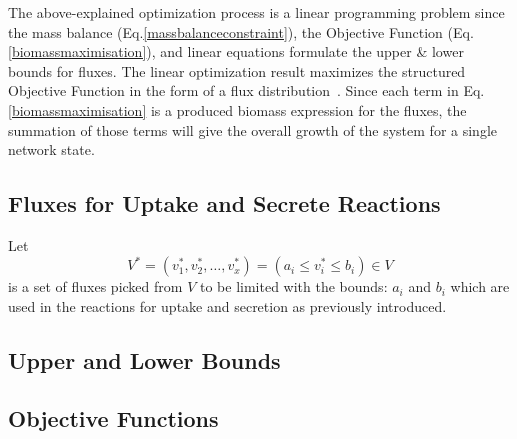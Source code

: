 

The above-explained optimization process is a linear programming problem since the mass balance (Eq.\eqref{massbalanceconstraint}), the Objective Function (Eq.\eqref{biomassmaximisation}), and linear equations formulate the upper \& lower bounds for fluxes. The linear optimization result maximizes the structured Objective Function in the form of a flux distribution~\cite{KAUFFMAN2003491,PRICE2004}. Since each term in Eq.\eqref{biomassmaximisation} is a produced biomass expression for the fluxes, the summation of those terms will give the overall growth of the system for a single network state.

\subsection*{Fluxes for Uptake and Secrete Reactions}
%
Let
\begin{equation} \tag{7}
	V^{*}=(v^{*}_{1}, v^{*}_{2},\dots, v^{*}_{x})= (a_{i}\le v^{*}_{i}\le b_{i})\in V
	\label{constrainedfluxlist}
\end{equation}
is a set of fluxes picked from $V$ to be limited with the bounds: $a_{i}$ and $b_{i}$ which are used in the reactions for uptake and secretion as previously introduced.
\subsection*{Upper and Lower Bounds}
%
\subsection*{Objective Functions}
%